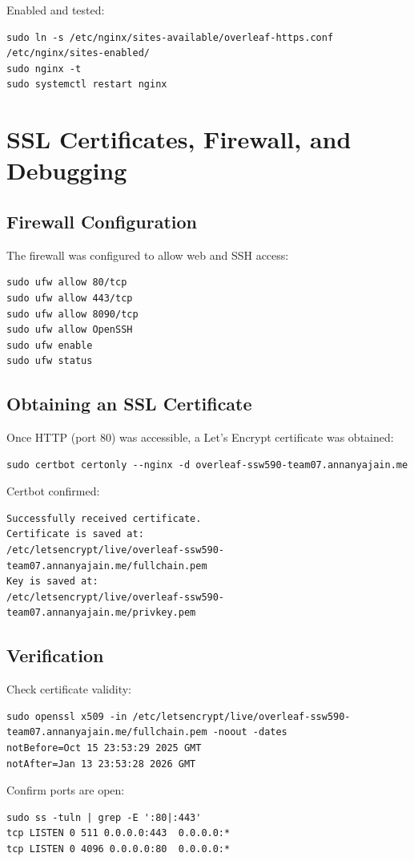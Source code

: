 Enabled and tested:
\begin{verbatim}
sudo ln -s /etc/nginx/sites-available/overleaf-https.conf /etc/nginx/sites-enabled/
sudo nginx -t
sudo systemctl restart nginx
\end{verbatim}

\section{SSL Certificates, Firewall, and Debugging}
\subsection{Firewall Configuration}
The firewall was configured to allow web and SSH access:
\begin{verbatim}
sudo ufw allow 80/tcp
sudo ufw allow 443/tcp
sudo ufw allow 8090/tcp
sudo ufw allow OpenSSH
sudo ufw enable
sudo ufw status
\end{verbatim}

\subsection{Obtaining an SSL Certificate}
Once HTTP (port 80) was accessible, a Let's Encrypt certificate was obtained:
\begin{verbatim}
sudo certbot certonly --nginx -d overleaf-ssw590-team07.annanyajain.me
\end{verbatim}

Certbot confirmed:
\begin{verbatim}
Successfully received certificate.
Certificate is saved at:
/etc/letsencrypt/live/overleaf-ssw590-team07.annanyajain.me/fullchain.pem
Key is saved at:
/etc/letsencrypt/live/overleaf-ssw590-team07.annanyajain.me/privkey.pem
\end{verbatim}

\subsection{Verification}
Check certificate validity:
\begin{verbatim}
sudo openssl x509 -in /etc/letsencrypt/live/overleaf-ssw590-team07.annanyajain.me/fullchain.pem -noout -dates
notBefore=Oct 15 23:53:29 2025 GMT
notAfter=Jan 13 23:53:28 2026 GMT
\end{verbatim}

Confirm ports are open:
\begin{verbatim}
sudo ss -tuln | grep -E ':80|:443'
tcp LISTEN 0 511 0.0.0.0:443  0.0.0.0:*
tcp LISTEN 0 4096 0.0.0.0:80  0.0.0.0:*
\end{verbatim}

